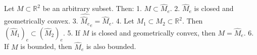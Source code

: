 Let $M \subset \mathbb{R}^2$ be an arbitrary subset. Then:
1. $M \subset \hat{M}_e$.
2. $\hat{M}_e$ is closed and geometrically convex.
3. $\widehat{\hat{M}_e}_e = \hat{M}_e$.
4. Let $M_1 \subset M_2 \subset \mathbb{R}^2$. Then $(\hat{M}_1)_e \subset (\hat{M}_2)_e$.
5. If $M$ is closed and geometrically convex, then $M = \hat{M}_e$.
6. If $M$ is bounded, then $\hat{M}_e$ is also bounded.
